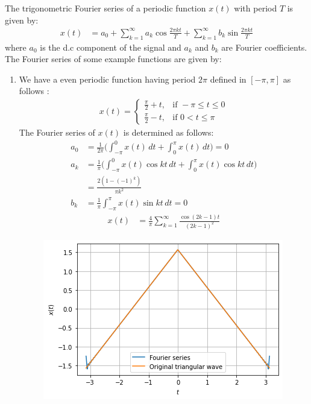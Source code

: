 
The trigonometric Fourier series of a periodic function $x(t)$ with period $T$ is given by:
\begin{align}
x(t) &= a_{0} + \sum_{k=1}^{\infty}a_{k}\cos{\frac{2\pi kt}{T}} +\sum_{k=1}^{\infty}b_{k}\sin{\frac{2\pi kt}{T}}
\end{align}
where $a_{0}$ is the d.c component of the signal and $a_{k}$ and $b_{k}$ are Fourier coefficients. The Fourier series of some example functions are given by:
\begin{enumerate}
\item We have a even periodic function having period $2\pi$ defined in $[-\pi,\pi]$ as follows :
\begin{align}
x(t)=  
\begin{cases}
\frac{\pi}{2}+t, & \text{if } -\pi \leq t \leq 0\\
\frac{\pi}{2}-t, & \text{if } 0 < t \leq \pi \nonumber
\end{cases}
\end{align}
The Fourier series of $x(t)$ is determined as follows:
\begin{align}
a_{0} &=\frac{1}{2\pi}\Bigg({\int_{-\pi}^{0}x(t)\, dt}+{\int_{0}^{\pi}x(t)\, dt}\Bigg)=0 \nonumber \\
a_{k} &= \frac{1}{\pi}\Bigg({\int_{-\pi}^{0}x(t)\cos{kt}\, dt}+{\int_{0}^{\pi}x(t)\cos{kt}\, dt}\Bigg) \nonumber \\
&= \frac{2(1-(-1)^{k})}{\pi k^{2}}\nonumber \\
b_{k} &= \frac{1}{\pi}{\int_{-\pi}^{\pi}x(t)\sin{kt}\, dt} = 0\nonumber
\end{align}
\begin{align}
x(t) &= \frac{4}{\pi}\sum_{k=1}^{\infty}\frac{\cos{(2k-1)t}}{(2k-1)^{2}}
\end{align}
\begin{figure}[!ht]
    \centering
    \includegraphics[width=\columnwidth] {solutions/ec/1998/1/4/Figures/Gate_Assignment_4_Fig_1.png}

\end{figure}
\end{enumerate}
